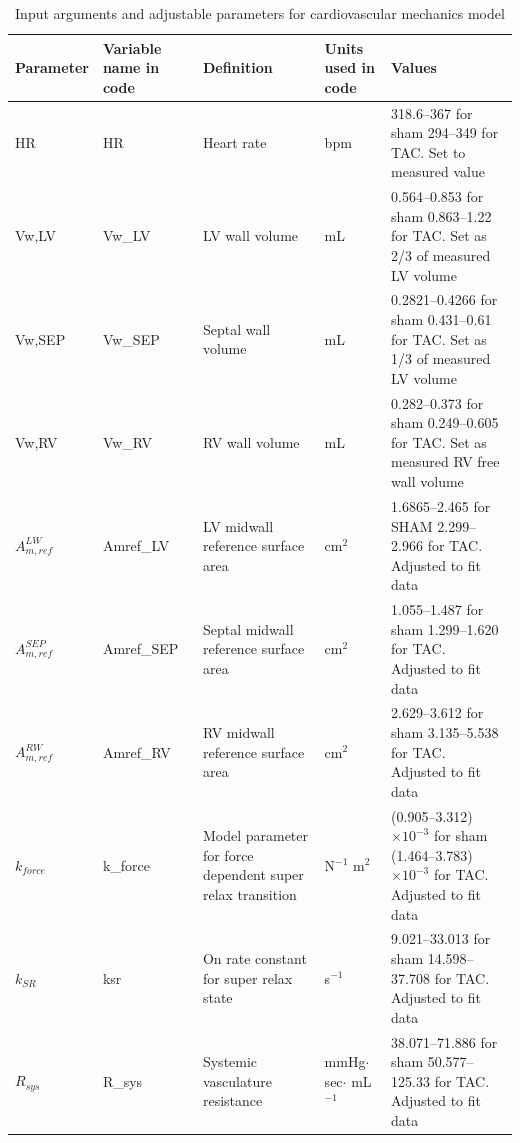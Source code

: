 \documentclass[fleqn,10pt]{physiome}
\begin{document}
\begin{table}[!htb]
\centering
\small
\caption{Input arguments and adjustable parameters for cardiovascular mechanics model}\label{tab:12}

\begin{supertabular}{p{1.8cm} p{1.4cm} p{3.0cm} p{1.8cm} p{3.6cm}}
\toprule
Parameter & Variable name in code & Definition & Units used in code & Values  \\
\midrule
HR & HR & Heart rate & bpm &  318.6--367 for sham 294--349 for TAC. Set to measured value \\

Vw,LV & Vw\_LV & LV wall volume & mL &  0.564--0.853 for sham 
0.863--1.22 for TAC. Set as 2/3 of measured LV volume \\

Vw,SEP & Vw\_SEP & Septal wall volume & mL &  0.2821--0.4266 for sham 
0.431--0.61 for TAC. Set as 1/3 of measured LV volume \\

Vw,RV & Vw\_RV & RV wall volume & mL &  0.282--0.373 for sham
0.249--0.605 for TAC. Set as measured RV free wall volume \\

$A_{m,ref}^{LW}$ & Amref\_LV & 
 LV midwall reference surface area
 & cm$^{2}$ &   1.6865--2.465 for SHAM
 2.299--2.966 for TAC.
 Adjusted to fit data
 \\

$A_{m,ref}^{SEP}$ & Amref\_SEP & 
 Septal midwall reference surface area
 & cm$^{2}$ &  1.055--1.487 for sham
1.299--1.620 for TAC.
 Adjusted to fit data
 \\

$A_{m,ref}^{RW}$ & Amref\_RV & 
 RV midwall reference surface area
 & cm$^{2}$ &  2.629--3.612 for sham
3.135--5.538 for TAC.
 Adjusted to fit data
 \\

$k_{force}$ & k\_force & Model parameter for force dependent super relax transition   & 
N$^{-1}$ m$^{2}$ &  (0.905--3.312)$\times 10^{-3}$ for sham
(1.464--3.783)$\times 10^{-3}$ for TAC. 
 Adjusted to fit data
 \\

$k_{SR}$ & ksr & On rate  constant for super relax state
& s$^{-1}$ &  9.021--33.013 for sham
14.598--37.708 for TAC.
 Adjusted to fit data
 \\

$R_{sys}$ & R\_sys & Systemic vasculature resistance
 & mmHg$\cdot$sec$\cdot$ mL$^{-1}$  &  38.071--71.886 for sham
50.577--125.33 for TAC.
 Adjusted to fit data
 \\


\end{supertabular}
\end{table}
\end{document}
